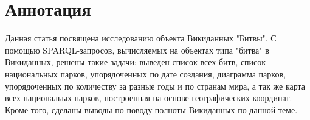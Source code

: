 \section{Аннотация}

Данная статья посвящена исследованию объекта Викиданных "Битвы". С помощью SPARQL-запросов, вычисляемых на объектах типа "битва" в Викиданных, решены такие задачи: выведен список всех битв, список национальных парков, упорядоченных по дате создания, диаграмма парков, упорядоченных по количеству за разные годы и по странам мира, а так же карта всех национальых парков, построенная на основе географических координат. Кроме того, сделаны выводы по поводу полноты Викиданных по данной теме.